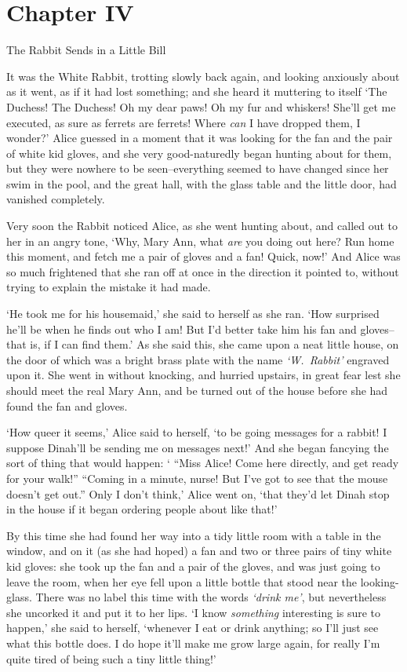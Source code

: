 \chapter{Chapter IV}{The Rabbit Sends in a Little Bill}


  It was the White Rabbit, trotting slowly back again, and
looking anxiously about as it went, as if it had lost something;
and she heard it muttering to itself `The Duchess!  The Duchess!
Oh my dear paws!  Oh my fur and whiskers!  She'll get me
executed, as sure as ferrets are ferrets!  Where {\it can} I have
dropped them, I wonder?'  Alice guessed in a moment that it was
looking for the fan and the pair of white kid gloves, and she
very good-naturedly began hunting about for them, but they were
nowhere to be seen--everything seemed to have changed since her
swim in the pool, and the great hall, with the glass table and
the little door, had vanished completely.

  Very soon the Rabbit noticed Alice, as she went hunting about,
and called out to her in an angry tone, `Why, Mary Ann, what {\it are}
you doing out here?  Run home this moment, and fetch me a pair of
gloves and a fan!  Quick, now!'  And Alice was so much frightened
that she ran off at once in the direction it pointed to, without
trying to explain the mistake it had made.

  `He took me for his housemaid,' she said to herself as she ran.
`How surprised he'll be when he finds out who I am!  But I'd
better take him his fan and gloves--that is, if I can find them.'
As she said this, she came upon a neat little house, on the door
of which was a bright brass plate with the name {\it `W.~Rabbit'}
engraved upon it.  She went in without knocking, and hurried
upstairs, in great fear lest she should meet the real Mary Ann,
and be turned out of the house before she had found the fan and
gloves.

  `How queer it seems,' Alice said to herself, `to be going
messages for a rabbit!  I suppose Dinah'll be sending me on
messages next!'  And she began fancying the sort of thing that
would happen:  ` ``Miss Alice!  Come here directly, and get ready
for your walk!'' ``Coming in a minute, nurse!  But I've got to see
that the mouse doesn't get out.''  Only I don't think,' Alice went
on, `that they'd let Dinah stop in the house if it began ordering
people about like that!'

  By this time she had found her way into a tidy little room with
a table in the window, and on it (as she had hoped) a fan and two
or three pairs of tiny white kid gloves:  she took up the fan and
a pair of the gloves, and was just going to leave the room, when
her eye fell upon a little bottle that stood near the looking-
glass.  There was no label this time with the words {\it `drink me'},
but nevertheless she uncorked it and put it to her lips.  `I know
{\it something} interesting is sure to happen,' she said to herself,
`whenever I eat or drink anything; so I'll just see what this
bottle does.  I do hope it'll make me grow large again, for
really I'm quite tired of being such a tiny little thing!'

